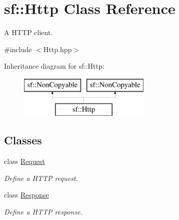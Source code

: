 \hypertarget{classsf_1_1_http}{\section{sf\-:\-:Http Class Reference}
\label{classsf_1_1_http}
}


A H\-T\-T\-P client.  




{\ttfamily \#include $<$Http.\-hpp$>$}

Inheritance diagram for sf\-:\-:Http\-:\begin{figure}[H]
\begin{center}
\leavevmode
\includegraphics[height=2.000000cm]{classsf_1_1_http}
\end{center}
\end{figure}
\subsection*{Classes}
\begin{DoxyCompactItemize}
\item 
class \hyperlink{classsf_1_1_http_1_1_request}{Request}
\begin{DoxyCompactList}\small\item\em Define a H\-T\-T\-P request. \end{DoxyCompactList}\item 
class \hyperlink{classsf_1_1_http_1_1_response}{Response}
\begin{DoxyCompactList}\small\item\em Define a H\-T\-T\-P response. \end{DoxyCompactList}\end{DoxyCompactItemize}
